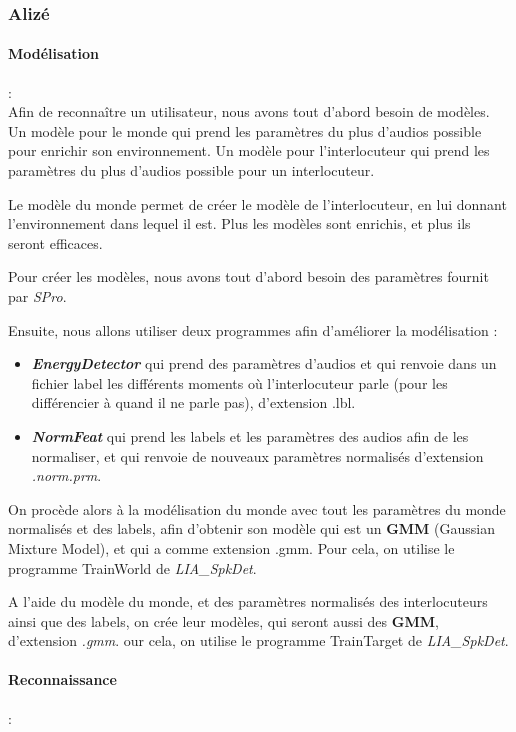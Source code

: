 \subsubsection{Alizé}
\label{sec:alizeImpl}


\paragraph*{Modélisation} : \\

Afin de reconnaître un utilisateur, nous avons tout d'abord besoin de modèles.
Un modèle pour le monde qui prend les paramètres du plus d'audios possible pour enrichir son environnement.
Un modèle pour l'interlocuteur qui prend les paramètres du plus d'audios possible pour un interlocuteur.

Le modèle du monde permet de créer le modèle de l'interlocuteur, en lui donnant l'environnement dans lequel il est.
Plus les modèles sont enrichis, et plus ils seront efficaces.

Pour créer les modèles, nous avons tout d'abord besoin des paramètres fournit par \textit{SPro}.

Ensuite, nous allons utiliser deux programmes afin d'améliorer la modélisation :
\begin{itemize}
    \item  \textit{\textbf{EnergyDetector}} qui prend des paramètres d'audios et qui renvoie dans un fichier label les différents moments où
          l'interlocuteur parle (pour les différencier à quand il ne parle pas), d'extension .lbl.
    \item\textit{\textbf{ NormFeat }} qui prend les labels et les paramètres des audios afin de les normaliser, et qui renvoie de
          nouveaux paramètres normalisés d'extension \textit{.norm.prm}.
\end{itemize}


On procède alors à la modélisation du monde avec tout les paramètres du monde normalisés et des labels, afin d'obtenir son modèle qui est un \textbf{GMM}
(Gaussian Mixture Model), et qui a comme extension .gmm.
Pour cela, on utilise le programme TrainWorld de \textit{  LIA\_SpkDet}.

A l'aide du modèle du monde, et des paramètres normalisés des interlocuteurs ainsi que des labels, on crée leur modèles, qui seront aussi des \textbf{GMM},
d'extension \textit{.gmm}.
our cela, on utilise le programme TrainTarget de \textit{ LIA\_SpkDet}.


\paragraph*{Reconnaissance} : \\

